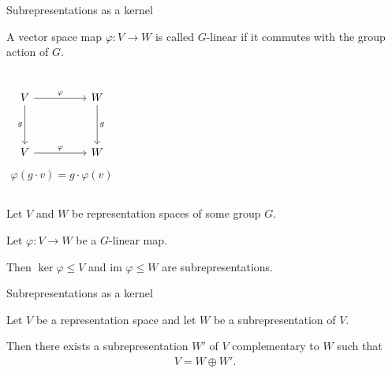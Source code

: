 \documentclass[10pt]{beamer}
\begin{document}
	\begin{frame}{Subrepresentations as a kernel}
		
		\begin{definition}
			A vector space map $\varphi : V \rightarrow W$ is called $G$-linear if it commutes with the group action of $G$.
			\begin{columns}
				\[\begin{tikzcd}[ampersand replacement=\&]
					V \&\& W \\
					\\
					V \&\& W
					\arrow["\varphi", from=1-1, to=1-3]
					\arrow["g"', from=1-1, to=3-1]
					\arrow["g", from=1-3, to=3-3]
					\arrow["\varphi", from=3-1, to=3-3]
				\end{tikzcd}\]
				\begin{align*}
					\varphi(g \cdot v) = g \cdot \varphi(v)
				\end{align*}
			\end{columns}
		\end{definition}\pause
		
		\begin{theorem}
			Let $V$ and $W$ be representation spaces of some group $G$.
			
			Let $\varphi: V \rightarrow W$ be a $G$-linear map. \pause
			
			Then $\ker \varphi \leq V$ and $\text{im } \varphi \leq W$ are subrepresentations.
		\end{theorem}
	\end{frame}
	\begin{frame}{Subrepresentations as a kernel}
		\begin{theorem}
			Let $V$ be a representation space and let $W$ be a subrepresentation of $V$.
			
			Then there exists a subrepresentation $W'$ of $V$ complementary to $W$ such that \begin{align*}
				V = W \oplus W'.
			\end{align*}
		\end{theorem}
	\end{frame}
\end{document}
